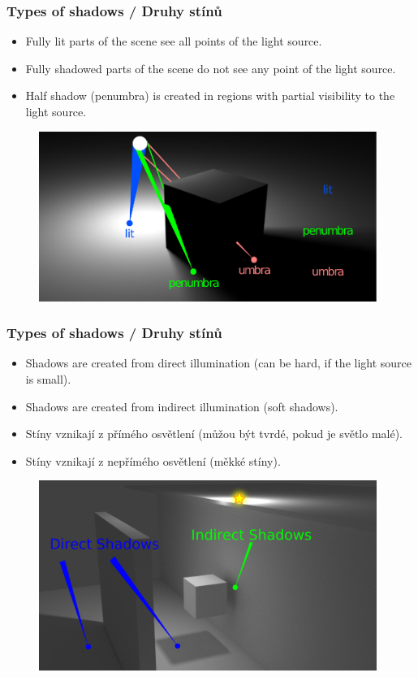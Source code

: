 \begin{frame}\frametitle{Types of shadows / Druhy stínů}\scriptsize
  \begin{itemize}
    \item Fully lit parts of the scene see all points of the light source.
    \item Fully shadowed parts of the scene do not see any point of the light source.
    \item Half shadow (penumbra) is created in regions with partial visibility to the light source.
  \end{itemize}
  \begin{figure}[h]
    \includegraphics[width=11cm,keepaspectratio]{pics/shadows/penumbra/penumbra}
  \end{figure}
\end{frame}

\begin{frame}\frametitle{Types of shadows / Druhy stínů}\scriptsize
  \begin{itemize}
    \item Shadows are created from direct illumination (can be hard, if the light source is small).
    \item Shadows are created from indirect illumination (soft shadows).
  \end{itemize}
  \begin{itemize}
    \item Stíny vznikají z přímého osvětlení (můžou být tvrdé, pokud je světlo malé).
    \item Stíny vznikají z nepřímého osvětlení (měkké stíny).
  \end{itemize}
  \begin{figure}[h]
    \includegraphics[width=11cm,keepaspectratio]{pics/shadows/indirectShadow/indirectShadows.pdf}
  \end{figure}
\end{frame}

